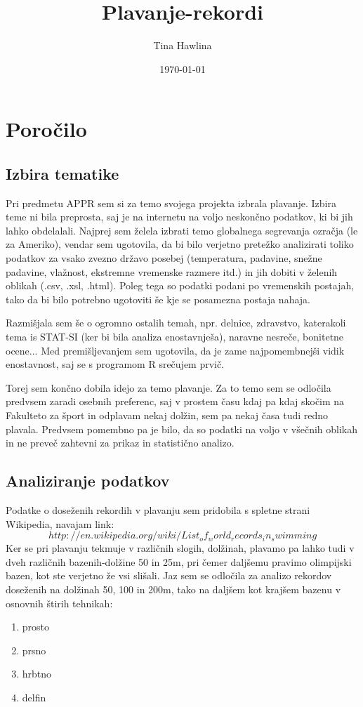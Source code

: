 \documentclass[10pt]{article}
\date{\today}
\title{Plavanje-rekordi}
\author{Tina Hawlina}
\begin{document}
\maketitle

\section{Poročilo}

\subsection{Izbira tematike}

Pri predmetu APPR sem si za temo svojega projekta izbrala plavanje. Izbira teme ni bila preprosta, saj je na internetu na voljo neskončno podatkov, ki bi jih lahko obdelalali. Najprej sem želela izbrati temo globalnega segrevanja ozračja (le za Ameriko), vendar sem ugotovila, da bi bilo verjetno pretežko analizirati toliko podatkov za vsako zvezno državo posebej (temperatura, padavine, snežne padavine, vlažnost, ekstremne vremenske razmere itd.) in jih dobiti v želenih oblikah (.csv, .xsl, .html). Poleg tega so podatki podani po vremenskih postajah, tako da bi bilo potrebno ugotoviti še kje se posamezna postaja nahaja.

Razmišjala sem še o ogromno ostalih temah, npr. delnice, zdravstvo, katerakoli tema is STAT-SI (ker bi bila analiza enostavnješa), naravne nesreče, bonitetne ocene... Med premišljevanjem sem ugotovila, da je zame najpomembnejši vidik enostavnost, saj se s programom R srečujem prvič.

Torej sem končno dobila idejo za temo plavanje. Za to temo sem se odločila predvsem zaradi osebnih preferenc, saj v prostem času kdaj pa kdaj skočim na Fakulteto za šport in odplavam nekaj dolžin, sem pa nekaj časa tudi redno plavala. Predvsem pomembno pa je bilo, da so podatki na voljo v všečnih oblikah in ne preveč zahtevni za prikaz in statistično analizo. 


\subsection{Analiziranje podatkov}

Podatke o doseženih rekordih v plavanju sem pridobila s spletne strani Wikipedia, navajam link:
$$http://en.wikipedia.org/wiki/List_of_world_records_in_swimming$$
Ker se pri plavanju tekmuje v različnih slogih, dolžinah, plavamo pa lahko tudi v dveh različnih bazenih-dolžine 50 in 25m, pri čemer daljšemu pravimo olimpijski bazen, kot ste verjetno že vsi slišali. Jaz sem se odločila za analizo rekordov doseženih na dolžinah 50, 100 in 200m, tako na daljšem kot krajšem bazenu v osnovnih štirih tehnikah:
\begin{enumerate}
\item prosto
\item prsno
\item hrbtno
\item delfin
\end{enumerate}
\end{document}
